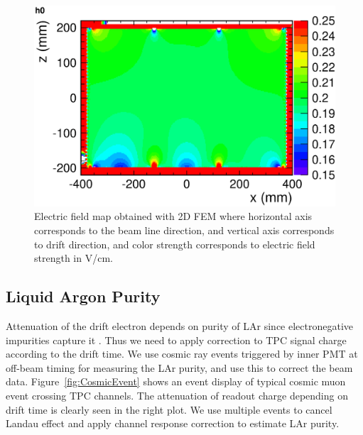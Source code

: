 \begin{figure}[htbp]
 \begin{center}
  \includegraphics[width=1.0\hsize]{fig/2DFieldMap.eps}
 \end{center}
 \caption{Electric field map obtained with 2D FEM where
horizontal axis corresponds to the beam line direction,
and vertical axis corresponds to drift direction,
and color strength corresponds to electric field strength in V/cm.
}
 \label{Fig:2DFieldMap}
\end{figure}

\subsection{Liquid Argon Purity}

Attenuation of the drift electron depends on purity of LAr since electronegative impurities capture it \cite{purity}. 
Thus we need to apply correction to TPC signal charge according to the drift time.
We use cosmic ray events triggered by inner PMT at off-beam timing for measuring the LAr purity, and use this to correct the beam data.
Figure~\ref{fig:CosmicEvent} shows an event display of typical cosmic muon event crossing TPC channels.
The attenuation of readout charge depending on drift time is clearly seen in the right plot. 
We use multiple events to cancel Landau effect and apply channel response correction to estimate LAr purity.

